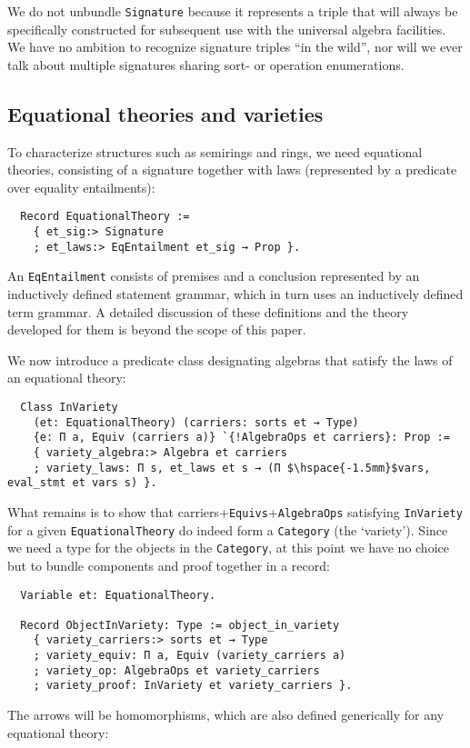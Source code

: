 \documentclass[a4paper,10pt,runningheads]{llncs}
\begin{document}
We do not unbundle \lstinline|Signature| because it represents a triple that will always be specifically constructed for subsequent use with the universal algebra facilities. We have no ambition to recognize signature triples ``in the wild'', nor will we ever talk about multiple signatures sharing sort- or operation enumerations.

\subsection{Equational theories and varieties}
\label{varieties}

To characterize structures such as semirings and rings, we need equational theories, consisting of a signature together with laws (represented by a predicate over equality entailments):
\begin{lstlisting}
  Record EquationalTheory :=
    { et_sig:> Signature
    ; et_laws:> EqEntailment et_sig → Prop }.
\end{lstlisting}
An \lstinline|EqEntailment| consists of premises and a conclusion represented by an inductively defined statement grammar, which in turn uses an inductively defined term grammar. A detailed discussion of these definitions and the theory developed for them is beyond the scope of this paper.

We now introduce a predicate class designating algebras that satisfy the laws of an equational theory:
\begin{lstlisting}
  Class InVariety
    (et: EquationalTheory) (carriers: sorts et → Type)
    {e: Π a, Equiv (carriers a)} `{!AlgebraOps et carriers}: Prop :=
    { variety_algebra:> Algebra et carriers
    ; variety_laws: Π s, et_laws et s → (Π $\hspace{-1.5mm}$vars, eval_stmt et vars s) }.
\end{lstlisting}

What remains is to show that carriers+\lstinline|Equivs|+\lstinline|AlgebraOps| satisfying \lstinline|InVariety| for a given \lstinline|EquationalTheory| do indeed form a \lstinline|Category| (the `variety'). Since we need a type for the objects in the \lstinline|Category|, at this point we have no choice but to bundle components and proof together in a record:
\begin{lstlisting}
  Variable et: EquationalTheory.

  Record ObjectInVariety: Type := object_in_variety
    { variety_carriers:> sorts et → Type
    ; variety_equiv: Π a, Equiv (variety_carriers a)
    ; variety_op: AlgebraOps et variety_carriers
    ; variety_proof: InVariety et variety_carriers }.
\end{lstlisting}
The arrows will be homomorphisms, which are also defined generically for any equational theory:
\end{document}
